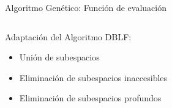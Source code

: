 \documentclass{beamer}
\begin{document}
\begin{frame}{Algoritmo Genético: Función de evaluación}
    \begin{columns}
        \begin{column}{0.5\textwidth}
            \begin{exampleblock}{Adaptación del Algoritmo DBLF:}
                \begin{itemize}[<+-| alert@+>]
                    \item Unión de subespacios
                    \item Eliminación de subespacios inaccesibles
                    \item Eliminación de subespacios profundos
                \end{itemize}
            \end{exampleblock}
        \end{column}
        \begin{column}{0.5\textwidth}
            \begin{overlayarea}{\textwidth}{\textheight}
\end{overlayarea}
\end{column}
\end{columns}
\end{frame}
\end{document}
